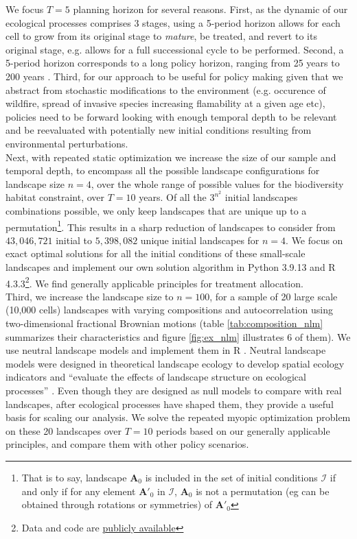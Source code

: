  We focus $T=5$ planning horizon for several reasons. First, as the dynamic of our ecological processes comprises 3 stages, using a 5-period horizon allows for each cell to grow from its original stage to \textit{mature}, be treated, and revert to its original stage, e.g. allows for a full successional cycle to be performed. Second, a 5-period horizon corresponds to a long policy horizon, ranging from 25 years to 200 years \citep{mccoll_gausden_pathways_2019, thomas_wildlife_1979}.
Third, for our approach to be useful for policy making given that we abstract from stochastic modifications to the environment (e.g. occurence of wildfire, spread of invasive species increasing flamability at a given age etc), policies need to be forward looking with enough temporal depth to be relevant and be reevaluated with potentially new initial conditions resulting from environmental perturbations.\\
%
Next, with repeated static optimization we increase the size of our sample and temporal depth, to encompass all the possible landscape configurations for landscape size $n=4$,
over the whole range of possible values for the biodiversity habitat constraint, over $T=10$ years. 
Of all the $3^{n^2}$ initial landscapes combinations possible, we only keep landscapes that are unique up to a permutation\footnote{That is to say, landscape $\mathbf{A}_0$ is included in the set of initial conditions $\mathcal{I}$ if and only if for any element $\mathbf{A'}_0$ in $\mathcal{I}$, $\mathbf{A}_0$ is not a permutation (eg can be obtained through rotations or symmetries) of $\mathbf{A'}_0$}. This results in a sharp reduction of landscapes to consider
from $43,046,721$ initial to $5,398,082$ unique initial landscapes for $n=4$. We focus on exact optimal solutions for all the initial conditions of these small-scale landscapes and implement our own solution algorithm in Python 3.9.13 and R 4.3.3\footnote{Data and code are \href{https://github.com/sim-jean/Landscape_connectivity_dilemma}{publicly available}}. We find generally applicable principles for treatment allocation.
\\
Third, we increase the landscape size to $n=100$, for a sample of 20 large scale (10,000 cells) landscapes with varying compositions and autocorrelation using two-dimensional fractional Brownian motions  (table \ref{tab:composition_nlm} summarizes their characteristics and figure \ref{fig:ex_nlm} illustrates 6 of them). We use neutral landscape models \citep{caswell_community_1976, gardner_neutral_2007} and implement them in \textsf{R} \citep{sciaini_nlmr_2018}. Neutral landscape models were designed in theoretical landscape ecology to develop spatial ecology indicators and ``evaluate the effects of landscape structure on ecological processes'' \citep{with_neutral_1997}. Even though they are designed as null models to compare with real landscapes, after ecological processes have shaped them, they provide a useful basis for scaling our analysis. We solve the repeated myopic optimization problem on these 20 landscapes over $T=10$ periods based on our generally applicable principles, and compare them with other policy scenarios.
